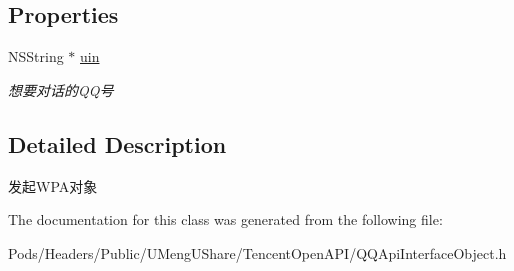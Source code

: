 \subsection*{Properties}
\begin{DoxyCompactItemize}
\item 
\mbox{\label{interface_q_q_api_w_p_a_object_a745f5d4c523650485bb8dc4ce720a34b}} 
N\+S\+String $\ast$ \mbox{\hyperlink{interface_q_q_api_w_p_a_object_a745f5d4c523650485bb8dc4ce720a34b}{uin}}
\begin{DoxyCompactList}\small\item\em 想要对话的\+Q\+Q号 \end{DoxyCompactList}\end{DoxyCompactItemize}


\subsection{Detailed Description}
发起\+W\+P\+A对象 

The documentation for this class was generated from the following file\+:\begin{DoxyCompactItemize}
\item 
Pods/\+Headers/\+Public/\+U\+Meng\+U\+Share/\+Tencent\+Open\+A\+P\+I/Q\+Q\+Api\+Interface\+Object.\+h\end{DoxyCompactItemize}
